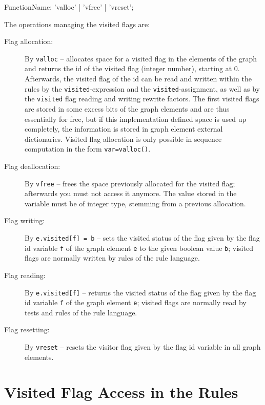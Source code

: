 \begin{rail}
  FunctionName: 'valloc' | 'vfree' | 'vreset';
\end{rail}

The operations managing the visited flags are:
\begin{description}
\item[Flag allocation:] By \texttt{valloc}\label{allocvisitflag} -- allocates space for a visited flag in the elements of the graph and returns the id of the visited flag (integer number), starting at 0.
Afterwards, the visited flag of the id can be read and written within the rules by the \texttt{visited}-expression and the \texttt{visited}-assignment,
as well as by the \texttt{visited} flag reading and writing rewrite factors.
The first visited flags are stored in some excess bits of the graph elements and are thus essentially for free,
but if this implementation defined space is used up completely, the information is stored in graph element external dictionaries.
Visited flag allocation is only possible in sequence computation in the form \texttt{var=valloc()}.
\item[Flag deallocation:] By \texttt{vfree} -- frees the space previously allocated for the visited flag; afterwards you must not access it anymore.
The value stored in the variable must be of integer type, stemming from a previous allocation.
\item[Flag writing:] By \texttt{e.visited[f] = b} -- sets the visited status of the flag given by the flag id variable \texttt{f} of the graph element \texttt{e} to the given boolean value \texttt{b}; visited flags are normally written by rules of the rule language.
\item[Flag reading:] By \texttt{e.visited[f]} -- returns the visited status of the flag given by the flag id variable \texttt{f} of the graph element \texttt{e}; visited flags are normally read by tests and rules of the rule language.
\item[Flag resetting:] By \texttt{vreset} -- resets the visitor flag given by the flag id variable in all graph elements.
\end{description}


\section{Visited Flag Access in the Rules} \label{sub:visitedaccess}

